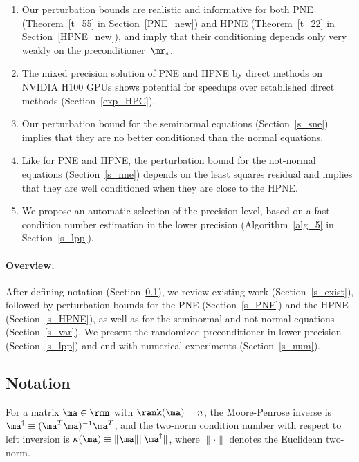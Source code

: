 \documentclass[final]{siamart220329}%
\begin{document}
 
\begin{enumerate}
\item Our perturbation bounds are realistic and informative for both PNE (Theorem~\ref{t_55}
in Section~\ref{PNE_new}) and HPNE (Theorem~\ref{t_22} in Section~\ref{HPNE_new}), and imply
that their conditioning depends only very weakly on the preconditioner~$\mr_s$.
    \item The mixed precision solution of PNE and HPNE by direct methods on NVIDIA H100 GPUs shows potential for speedups over established direct methods (Section~\ref{exp_HPC}). 
   
    \item Our perturbation bound for the seminormal equations (Section~\ref{s_sne}) implies that they are no better conditioned  than the normal equations.
    \item Like for PNE and HPNE, the perturbation bound for the not-normal equations (Section~\ref{s_nne}) depends on 
    the least squares residual and implies that they are well conditioned when they are close to the HPNE.
\item We propose an automatic selection of the precision level, based on a fast condition
number estimation in the lower precision (Algorithm~\ref{alg_5}
in Section~\ref{s_lpp}).
\end{enumerate}

\paragraph{Overview.} After defining notation (Section~\ref{s_notation}), we review existing work (Section~\ref{s_exist}), followed by perturbation bounds for the PNE (Section~\ref{s_PNE}) and the HPNE (Section~\ref{s_HPNE}), as well as for the seminormal and not-normal equations (Section~\ref{s_var}). We present the randomized preconditioner in lower precision (Section~\ref{s_lpp}) and end with  numerical experiments (Section~\ref{s_num}).

\subsection{Notation}\label{s_notation}
 For a matrix $\ma\in\rmn$ with 
$\rank(\ma)=n$, the Moore-Penrose inverse is $\ma^{\dagger}\equiv(\ma^T\ma)^{-1}\ma^T$, and 
the two-norm condition number with respect to left inversion is 
$\kappa(\ma)\equiv\|\ma\|\|\ma^{\dagger}\|$, where $\|\cdot\|$ denotes the Euclidean two-norm.
\end{document}
